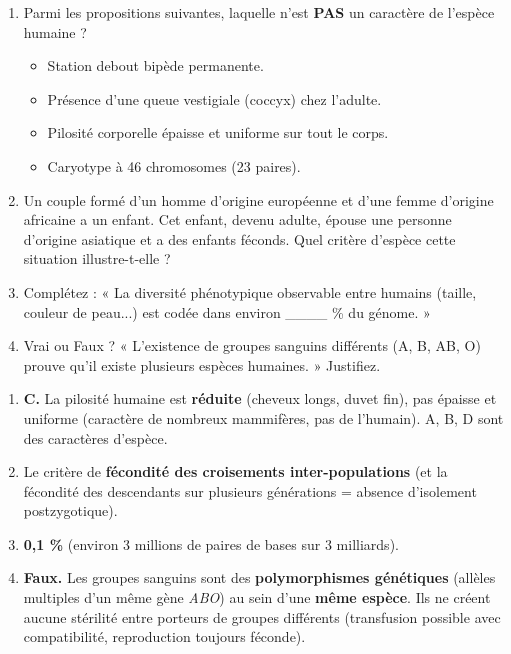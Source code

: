 \documentclass[11pt]{article}
\begin{document}
\begin{exercice}
\begin{enumerate}
    \item Parmi les propositions suivantes, laquelle n'est \textbf{PAS} un caractère de l'espèce humaine ?
    \begin{itemize}
        \item[A.] Station debout bipède permanente.
        \item[B.] Présence d'une queue vestigiale (coccyx) chez l'adulte.
        \item[C.] Pilosité corporelle épaisse et uniforme sur tout le corps.
        \item[D.] Caryotype à 46 chromosomes (23 paires).
    \end{itemize}
    \item Un couple formé d'un homme d'origine européenne et d'une femme d'origine africaine a un enfant. Cet enfant, devenu adulte, épouse une personne d'origine asiatique et a des enfants féconds. Quel critère d'espèce cette situation illustre-t-elle ?
    \item Complétez : « La diversité phénotypique observable entre humains (taille, couleur de peau...) est codée dans environ \_\_\_\_ \% du génome. »
    \item Vrai ou Faux ? « L'existence de groupes sanguins différents (A, B, AB, O) prouve qu'il existe plusieurs espèces humaines. » Justifiez.
\end{enumerate}
\end{exercice}

\begin{corrige}[Exercice 1]
\begin{enumerate}
    \item \textbf{C.} La pilosité humaine est \textbf{réduite} (cheveux longs, duvet fin), pas épaisse et uniforme (caractère de nombreux mammifères, pas de l'humain). A, B, D sont des caractères d'espèce.
    \item Le critère de \textbf{fécondité des croisements inter-populations} (et la fécondité des descendants sur plusieurs générations = absence d'isolement postzygotique).
    \item \textbf{0,1 \%} (environ 3 millions de paires de bases sur 3 milliards).
    \item \textbf{Faux.} Les groupes sanguins sont des \textbf{polymorphismes génétiques} (allèles multiples d'un même gène \emph{ABO}) au sein d'une \textbf{même espèce}. Ils ne créent aucune stérilité entre porteurs de groupes différents (transfusion possible avec compatibilité, reproduction toujours féconde).
\end{enumerate}
\end{corrige}
\end{document}
